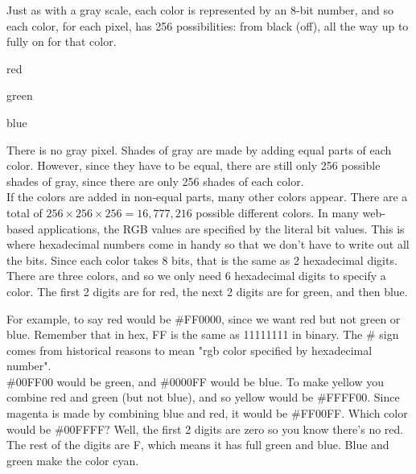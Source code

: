 Just as with a gray scale, each color is represented by an 8-bit number, and so each color, for each pixel, has 256 possibilities: from black (off), all the way up to fully on for that color.\\

\begin{center}red\\ \end{center}
\begin{center}green\\ \end{center}
\begin{center}blue\\ \end{center}


There is no gray pixel. Shades of gray are made by adding equal parts of each color. However, since they have to be equal, there are still only 256 possible shades of gray, since there are only 256 shades of each color.\\

If the colors are added in non-equal parts, many other colors appear. There are a total of \(256\times256\times256 = 16,777,216 \) possible different colors. In many web-based applications, the RGB values are specified by the literal bit values. This is where hexadecimal numbers come in handy so that we don't have to write out all the bits. Since each color takes 8 bits, that is the same as 2 hexadecimal digits. There are three colors, and so we only need 6 hexadecimal digits to specify a color. The first 2 digits are for red, the next 2 digits are for green, and then blue.\\

\begin{center}\end{center}

For example, to say red would be \#FF0000, since we want red but not green or blue. Remember that in hex, FF is the same as 11111111 in binary. The \# sign comes from historical reasons to mean "rgb color specified by hexadecimal number".\\

\#00FF00 would be green, and \#0000FF would be blue. To make yellow you combine red and green (but not blue), and so yellow would be \#FFFF00. Since magenta is made by combining blue and red, it would be \#FF00FF. Which color would be \#00FFFF? Well, the first 2 digits are zero so you know there's no red. The rest of the digits are F, which means it has full green and blue. Blue and green make the color cyan.\\

